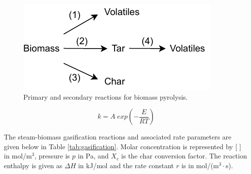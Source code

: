\documentclass[12pt]{article}
\begin{document}
\begin{figure}[ht]
    \centering
    \includegraphics{figures/pyrolysis.pdf}
    \caption{Primary and secondary reactions for biomass pyrolysis.}
    \label{fig:pyrolysis}
\end{figure}

\begin{equation}
    k = A\; exp \left( -\frac{E}{R T} \right) \label{eq:kpyro}
\end{equation}

The steam-biomass gasification reactions and associated rate parameters are given below in Table \ref{tab:gasification}. Molar concentration is represented by [ ] in mol/m$^3$, pressure is $p$ in Pa, and $X_c$ is the char conversion factor. The reaction enthalpy is given as $\Delta H$ in kJ/mol and the rate constant $r$ is in mol/(m$^3 \cdot$s).
\end{document}
